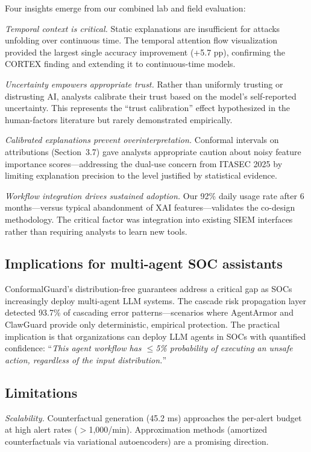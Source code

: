\documentclass[preprint,review,12pt]{elsarticle}
\begin{document}
Four insights emerge from our combined lab and field evaluation:

\textit{Temporal context is critical.} Static explanations are insufficient for attacks unfolding over continuous time. The temporal attention flow visualization provided the largest single accuracy improvement (+5.7 pp), confirming the CORTEX finding and extending it to continuous-time models.

\textit{Uncertainty empowers appropriate trust.} Rather than uniformly trusting or distrusting AI, analysts calibrate their trust based on the model's self-reported uncertainty. This represents the ``trust calibration'' effect hypothesized in the human-factors literature but rarely demonstrated empirically.

\textit{Calibrated explanations prevent overinterpretation.} Conformal intervals on attributions (Section~3.7) gave analysts appropriate caution about noisy feature importance scores---addressing the dual-use concern from ITASEC 2025 by limiting explanation precision to the level justified by statistical evidence.

\textit{Workflow integration drives sustained adoption.} Our 92\% daily usage rate after 6 months---versus typical abandonment of XAI features---validates the co-design methodology. The critical factor was integration into existing SIEM interfaces rather than requiring analysts to learn new tools.

\subsection{Implications for multi-agent SOC assistants}

ConformalGuard's distribution-free guarantees address a critical gap as SOCs increasingly deploy multi-agent LLM systems. The cascade risk propagation layer detected 93.7\% of cascading error patterns---scenarios where AgentArmor and ClawGuard provide only deterministic, empirical protection. The practical implication is that organizations can deploy LLM agents in SOCs with quantified confidence: ``\textit{This agent workflow has $\leq$5\% probability of executing an unsafe action, regardless of the input distribution.}''

\subsection{Limitations}

\textit{Scalability.} Counterfactual generation (45.2 ms) approaches the per-alert budget at high alert rates ($>$1{,}000/min). Approximation methods (amortized counterfactuals via variational autoencoders) are a promising direction.
\end{document}
